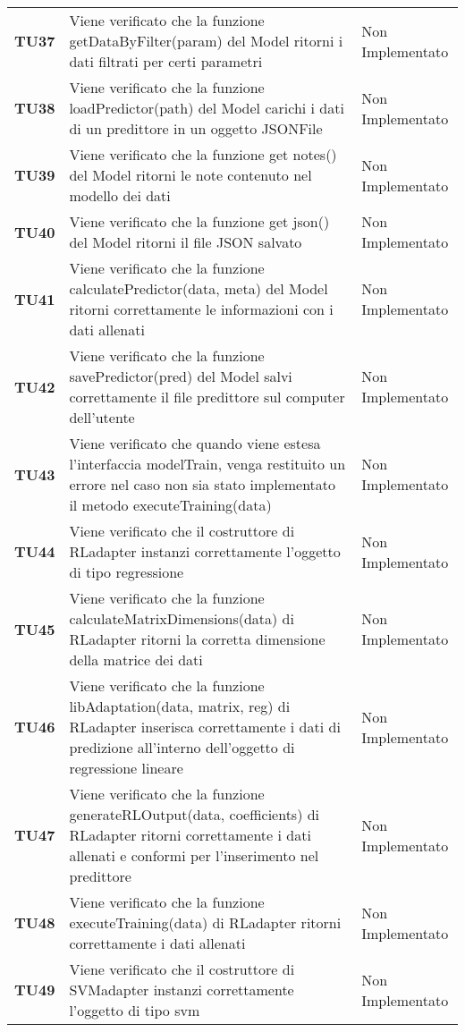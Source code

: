 \documentclass[../piano-di-qualifica.tex]{subfiles}
\begin{document}
\begin{longtable}[H]{>{\centering\bfseries}m{2.5cm} >{\centering}m{7.5cm} >{\centering\arraybackslash}m{3.5cm}}
  \textbf{TU37} & Viene verificato che la funzione getDataByFilter(param) del Model ritorni i dati filtrati per certi parametri & Non Implementato \\
  \textbf{TU38} & Viene verificato che la funzione loadPredictor(path) del Model carichi i dati di un predittore in un oggetto JSONFile & Non Implementato \\
  \textbf{TU39} & Viene verificato che la funzione get notes() del Model ritorni le note contenuto nel modello dei dati & Non Implementato \\
  \textbf{TU40} & Viene verificato che la funzione get json() del Model ritorni il file JSON salvato & Non Implementato \\
  \textbf{TU41} & Viene verificato che la funzione calculatePredictor(data, meta) del Model ritorni correttamente le informazioni con i dati allenati & Non Implementato \\
  \textbf{TU42} & Viene verificato che la funzione savePredictor(pred) del Model salvi correttamente il file predittore sul computer dell'utente & Non Implementato \\
  \textbf{TU43} & Viene verificato che quando viene estesa l'interfaccia modelTrain, venga restituito un errore nel caso non sia stato implementato il metodo executeTraining(data) & Non Implementato \\
  \textbf{TU44} & Viene verificato che il costruttore di RLadapter instanzi correttamente l'oggetto di tipo regressione & Non Implementato \\
  \textbf{TU45} & Viene verificato che la funzione calculateMatrixDimensions(data) di RLadapter ritorni la corretta dimensione della matrice dei dati & Non Implementato \\
  \textbf{TU46} & Viene verificato che la funzione libAdaptation(data, matrix, reg) di RLadapter inserisca correttamente i dati di predizione all'interno dell'oggetto di regressione lineare & Non Implementato \\
  \textbf{TU47} & Viene verificato che la funzione generateRLOutput(data, coefficients) di RLadapter ritorni correttamente i dati allenati e conformi per l'inserimento nel predittore & Non Implementato \\
  \textbf{TU48} & Viene verificato che la funzione executeTraining(data) di RLadapter ritorni correttamente i dati allenati & Non Implementato \\
  \textbf{TU49} & Viene verificato che il costruttore di SVMadapter instanzi correttamente l'oggetto di tipo svm & Non Implementato \\

\end{longtable}
\end{document}
